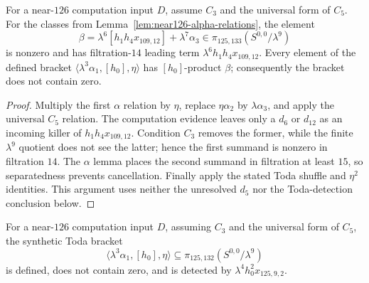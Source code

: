 \begin{lemma}
  \label{lem:toda-h0-leading-nonvanishing}
  \notready
  For a near-$126$ computation input $D$, assume $C_3$ and the universal form
  of $C_5$.  For the classes from
  Lemma~\ref{lem:near126-alpha-relations}, the element
  \[
    \beta=\lambda^6[h_1h_4x_{109,12}]+\lambda^7\alpha_3
      \in\pi_{125,133}(S^{0,0}/\lambda^9)
  \]
  is nonzero and has filtration-$14$ leading term
  $\lambda^6h_1h_4x_{109,12}$.  Every element of the defined bracket
  $\langle\lambda^3\alpha_1,[h_0],\eta\rangle$ has $[h_0]$-product
  $\beta$; consequently the bracket does not contain zero.
\end{lemma}

\begin{proof}
  Multiply the first $\alpha$ relation by $\eta$, replace
  $\eta\alpha_2$ by $\lambda\alpha_3$, and apply the universal $C_5$
  relation.  The computation evidence leaves only a $d_6$ or $d_{12}$ as an
  incoming killer of $h_1h_4x_{109,12}$.  Condition $C_3$ removes the former,
  while the finite $\lambda^9$ quotient does not see the latter; hence the
  first summand is nonzero in filtration $14$.  The $\alpha$ lemma places the
  second summand in filtration at least $15$, so separatedness prevents
  cancellation.  Finally apply the stated Toda shuffle and
  $\eta^2$ identities.  This argument uses neither the unresolved $d_5$ nor
  the Toda-detection conclusion below.
\end{proof}

\begin{lemma}
  \label{lem:toda-two-extension}
  \notready
  For a near-$126$ computation input $D$, assuming $C_3$ and the universal
  form of $C_5$, the synthetic Toda bracket
  \[
    \langle\lambda^3\alpha_1,[h_0],\eta\rangle
       \subseteq\pi_{125,132}(S^{0,0}/\lambda^9)
  \]
  is defined, does not contain zero, and is detected by
  $\lambda^4h_0^2x_{125,9,2}$.
\end{lemma}

